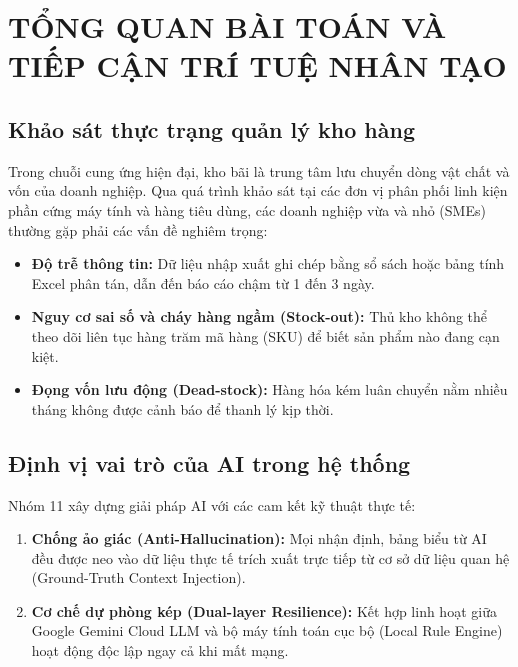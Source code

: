 \chapter{TỔNG QUAN BÀI TOÁN VÀ TIẾP CẬN TRÍ TUỆ NHÂN TẠO}

\section{Khảo sát thực trạng quản lý kho hàng}
Trong chuỗi cung ứng hiện đại, kho bãi là trung tâm lưu chuyển dòng vật chất và vốn của doanh nghiệp. Qua quá trình khảo sát tại các đơn vị phân phối linh kiện phần cứng máy tính và hàng tiêu dùng, các doanh nghiệp vừa và nhỏ (SMEs) thường gặp phải các vấn đề nghiêm trọng:
\begin{itemize}
    \item \textbf{Độ trễ thông tin:} Dữ liệu nhập xuất ghi chép bằng sổ sách hoặc bảng tính Excel phân tán, dẫn đến báo cáo chậm từ 1 đến 3 ngày.
    \item \textbf{Nguy cơ sai số và cháy hàng ngầm (Stock-out):} Thủ kho không thể theo dõi liên tục hàng trăm mã hàng (SKU) để biết sản phẩm nào đang cạn kiệt.
    \item \textbf{Đọng vốn lưu động (Dead-stock):} Hàng hóa kém luân chuyển nằm nhiều tháng không được cảnh báo để thanh lý kịp thời.
\end{itemize}

\section{Định vị vai trò của AI trong hệ thống}
Nhóm 11 xây dựng giải pháp AI với các cam kết kỹ thuật thực tế:
\begin{enumerate}
    \item \textbf{Chống ảo giác (Anti-Hallucination):} Mọi nhận định, bảng biểu từ AI đều được neo vào dữ liệu thực tế trích xuất trực tiếp từ cơ sở dữ liệu quan hệ (Ground-Truth Context Injection).
    \item \textbf{Cơ chế dự phòng kép (Dual-layer Resilience):} Kết hợp linh hoạt giữa Google Gemini Cloud LLM và bộ máy tính toán cục bộ (Local Rule Engine) hoạt động độc lập ngay cả khi mất mạng.
\end{enumerate}

